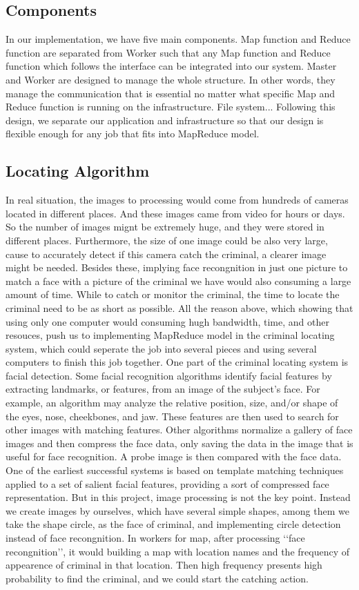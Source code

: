 \documentclass[12pt]{article}
\begin{document}
\subsection{Components}

In our implementation, we have five main components. 
Map function and Reduce function are separated from Worker such that any Map function and Reduce function which
follows the interface can be integrated into our system.
Master and Worker are designed to manage the whole structure. In other words, they manage the communication that
is essential no matter what specific Map and Reduce function is running on the infrastructure.
File system...
Following this design, we separate our application and infrastructure so that our design is flexible enough
for any job that fits into MapReduce model. 
\subsection{Locating Algorithm }

In real situation, the images to processing would come from hundreds of cameras located in different places. And these images came from video for hours or days. So the number of images mignt be extremely huge, and they were stored in different places. Furthermore, the size of one image could be also very large, cause to accurately detect if this camera catch the criminal, a clearer image might be needed. Besides these, implying face recongnition in just one picture to match a face with a picture of the criminal we have would also consuming a large amount of time. While to catch or monitor the criminal, the time to locate the criminal need to be as short as possible. All the reason above, which showing that using only one computer would consuming hugh bandwidth, time, and other resouces, push us to implementing MapReduce model in the criminal locating system, which could seperate the job into several pieces and using several computers to finish this job together. 
One part of the criminal locating system is facial detection. Some facial recognition algorithms identify facial features by extracting landmarks, or features, from an image of the subject's face. For example, an algorithm may analyze the relative position, size, and/or shape of the eyes, nose, cheekbones, and jaw. These features are then used to search for other images with matching features. Other algorithms normalize a gallery of face images and then compress the face data, only saving the data in the image that is useful for face recognition. A probe image is then compared with the face data. One of the earliest successful systems is based on template matching techniques applied to a set of salient facial features, providing a sort of compressed face representation.
But in this project, image processing is not the key point. Instead we create images by ourselves, which have several simple shapes, among them we take the shape circle, as the face of criminal, and implementing circle detection instead of face recongnition. 
In workers for map, after processing \lq\lq face recongnition\rq\rq, it would building a map with location names and the frequency of appearence of criminal in that location. Then high frequency presents high probability to find the criminal, and we could start the catching action. 
\end{document}
